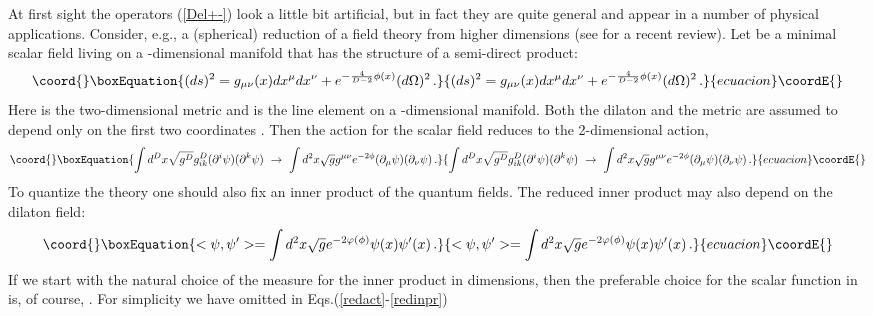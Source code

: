 \documentclass[a4paper,12pt]{article}
\begin{document}
At first sight the operators (\ref{Del+-}) look a little bit
artificial, but in fact they are quite general and 
appear in a number of physical applications. 
Consider, e.g., a (spherical) reduction of a field theory
from higher dimensions (see \cite{Kummer:1999zy} for a
recent review). Let \myHighlight{$\psi$}\coordHE{} be a minimal scalar field living on 
a \coordHE{}-dimensional manifold that has the structure of a 
semi-direct product:
\begin{equation}\coord{}\boxEquation{
(ds)^2=g_{\mu\nu}(x)dx^\mu dx^\nu + e^{-\frac 4{D-2} \phi (x)}
(d\Omega )^2 \,.\label{line}
}{
(ds)^2=g_{\mu\nu}(x)dx^\mu dx^\nu + e^{-\frac 4{D-2} \phi (x)}
(d\Omega )^2 \,.}{ecuacion}\coordE{}\end{equation}
Here \coordHE{} is the two-dimensional metric and
\coordHE{} is the line element on a \coordHE{}-dimensional
manifold. Both the dilaton \coordHE{} and the metric \coordHE{}
are assumed to depend only on the first two coordinates \coordHE{}. 
Then the action for the scalar field reduces to the 2-dimensional 
action,
\begin{equation}\coord{}\boxEquation{
\int d^Dx\sqrt{g^D} g^D_{ik}(\partial^i\psi )(\partial^k\psi)
\ \to \ \int d^2x \sqrt{g} g^{\mu\nu} e^{-2\phi}
 (\partial_\mu\psi) (\partial_\nu \psi )\,.
\label{redact}
}{
\int d^Dx\sqrt{g^D} g^D_{ik}(\partial^i\psi )(\partial^k\psi)
\ \to \ \int d^2x \sqrt{g} g^{\mu\nu} e^{-2\phi}
 (\partial_\mu\psi) (\partial_\nu \psi )\,.
}{ecuacion}\coordE{}\end{equation}
To quantize the theory one should also fix an inner product
of the quantum fields. 
The reduced inner product may also depend on the dilaton
field:
\begin{equation}\coord{}\boxEquation{
<\psi ,\psi' >=\int d^2x \sqrt{g}e^{-2\varphi(\phi)}
\psi (x) \psi'(x) \,. \label{redinpr}
}{
<\psi ,\psi' >=\int d^2x \sqrt{g}e^{-2\varphi(\phi)}
\psi (x) \psi'(x) \,. }{ecuacion}\coordE{}\end{equation} 
If we start with the natural choice of the measure \coordHE{}
for the inner product in \coordHE{} dimensions, then the 
preferable choice for the scalar function \myHighlight{$\varphi (\phi )$}\coordHE{} in \coordHE{}
is, of course, \myHighlight{$\varphi (\phi )=\phi$}\coordHE{}. For simplicity  
we have omitted in Eqs.(\ref{redact}-\ref{redinpr}) 
\end{document}
